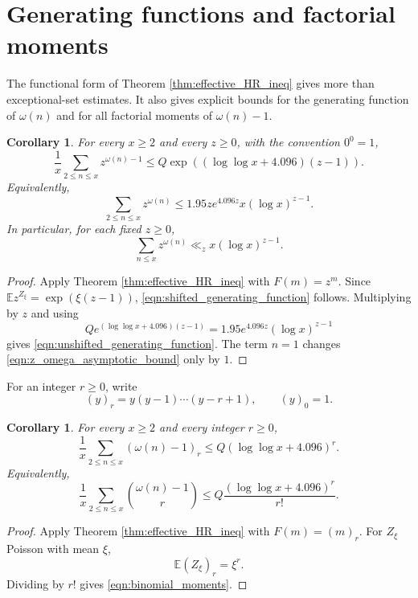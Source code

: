 \documentclass[12pt,a4paper,reqno]{amsart}
\theoremstyle{plain}
\newtheorem{crllry}[thrm]{Corollary}
\numberwithin{sblmm}{thrm}
\numberwithin{equation}{section}
\begin{document}
\section{Generating functions and factorial moments}
The functional form of Theorem \ref{thm:effective_HR_ineq} gives more than exceptional-set estimates. It also gives explicit bounds for the generating function of $\omega(n)$ and for all factorial moments of $\omega(n)-1$.

\begin{crllry}\label{cor:generating_function}
    For every $x\ge 2$ and every $z\ge 0$, with the convention $0^0=1$,
    \begin{equation}\label{eqn:shifted_generating_function}
        \frac{1}{x}\sum_{2\le n\le x}z^{\omega(n)-1}\le Q\exp((\log\log x+4.096)(z-1)).
    \end{equation}
    Equivalently,
    \begin{equation}\label{eqn:unshifted_generating_function}
        \sum_{2\le n\le x}z^{\omega(n)}\le 1.95ze^{4.096z}x(\log x)^{z-1}.
    \end{equation}
    In particular, for each fixed $z\ge 0$,
    \begin{equation}\label{eqn:z_omega_asymptotic_bound}
        \sum_{n\le x}z^{\omega(n)}\ll_z x(\log x)^{z-1}.
    \end{equation}
\end{crllry}
\begin{proof}
    Apply Theorem \ref{thm:effective_HR_ineq} with $F(m)=z^m$. Since $\mathbb{E}z^{Z_{\xi}}=\exp(\xi(z-1))$, \eqref{eqn:shifted_generating_function} follows. Multiplying by $z$ and using
    $$Qe^{(\log\log x+4.096)(z-1)}=1.95e^{4.096z}(\log x)^{z-1}$$
    gives \eqref{eqn:unshifted_generating_function}. The term $n=1$ changes \eqref{eqn:z_omega_asymptotic_bound} only by $1$.
\end{proof}

For an integer $r\ge 0$, write
$$(y)_r=y(y-1)\cdots(y-r+1),\qquad (y)_0=1.$$

\begin{crllry}\label{cor:factorial_moments}
    For every $x\ge 2$ and every integer $r\ge 0$,
    \begin{equation}\label{eqn:factorial_moments}
        \frac{1}{x}\sum_{2\le n\le x}(\omega(n)-1)_r\le Q(\log\log x+4.096)^r.
    \end{equation}
    Equivalently,
    \begin{equation}\label{eqn:binomial_moments}
        \frac{1}{x}\sum_{2\le n\le x}\binom{\omega(n)-1}{r}\le Q\frac{(\log\log x+4.096)^r}{r!}.
    \end{equation}
\end{crllry}
\begin{proof}
    Apply Theorem \ref{thm:effective_HR_ineq} with $F(m)=(m)_r$. For $Z_{\xi}$ Poisson with mean $\xi$,
    $$\mathbb{E}(Z_{\xi})_r=\xi^r.$$
    Dividing by $r!$ gives \eqref{eqn:binomial_moments}.
\end{proof}
\end{document}

